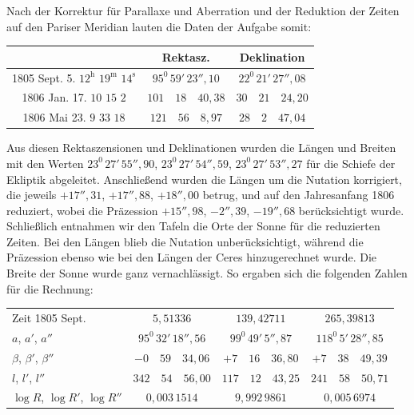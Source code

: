 Nach der Korrektur für Parallaxe und Aberration und der Reduktion der Zeiten
auf den Pariser Meridian lauten die Daten der Aufgabe somit:
\begin{center}\begingroup\footnotesize\setlength{\tabcolsep}{3pt}\renewcommand{\arraystretch}{1.3}
\begin{tabular}{|c|c|c|}
\hline
 & Rektasz. & Deklination \\
\hline
1805 Sept. 5. $12^{\mathrm h}$ $19^{\mathrm m}$ $14^{\mathrm s}$ & $95^0\,59'\,23''{,}10$ & $22^0\,21'\,27''{,}08$ \\
1806 Jan. 17. $10$ $15$ $2$ & $101\quad18\quad40{,}38$ & $30\quad21\quad24{,}20$ \\
1806 Mai 23. $9$ $33$ $18$ & $121\quad56\quad8{,}97$ & $28\quad2\quad47{,}04$ \\
\hline
\end{tabular}
\endgroup\end{center}

Aus diesen Rektaszensionen und Deklinationen wurden die Längen und Breiten
mit den Werten $23^0\,27'\,55''{,}90$, $23^0\,27'\,54''{,}59$,
$23^0\,27'\,53''{,}27$ für die Schiefe der Ekliptik abgeleitet. Anschließend wurden die Längen um die Nutation korrigiert, die jeweils
$+17''{,}31$, $+17''{,}88$, $+18''{,}00$ betrug, und auf den Jahresanfang 1806 reduziert, wobei die Präzession $+15''{,}98$, $-2''{,}39$, $-19''{,}68$ berücksichtigt wurde. Schließlich entnahmen wir
den Tafeln die Orte der Sonne für die reduzierten Zeiten. Bei den Längen blieb
die Nutation unberücksichtigt, während die Präzession ebenso wie bei den Längen der Ceres hinzugerechnet wurde. Die Breite der Sonne
wurde ganz vernachlässigt. So ergaben sich die folgenden Zahlen für die Rechnung:
\begin{center}\begingroup\footnotesize\setlength{\tabcolsep}{3pt}\renewcommand{\arraystretch}{1.3}
\begin{tabular}{l|c|c|c}
Zeit 1805 Sept. & $5{,}51336$ & $139{,}42711$ & $265{,}39813$ \\
$a$, $a'$, $a''$ & $95^0\,32'\,18''{,}56$ & $99^0\,49'\,5''{,}87$ & $118^0\,5'\,28''{,}85$ \\
$\beta$, $\beta'$, $\beta''$ & $-0\quad59\quad34{,}06$ & $+7\quad16\quad36{,}80$ & $+7\quad38\quad49{,}39$ \\
$l$, $l'$, $l''$ & $342\quad54\quad56{,}00$ & $117\quad12\quad43{,}25$ & $241\quad58\quad50{,}71$ \\
$\log R$, $\log R'$, $\log R''$ & $0{,}003\,1514$ & $9{,}992\,9861$ & $0{,}005\,6974$ \\
\end{tabular}
\endgroup\end{center}

